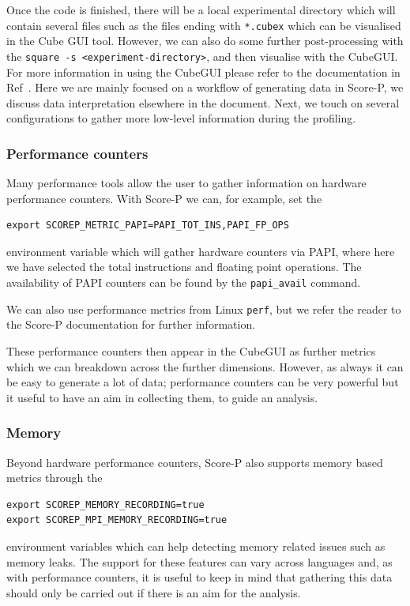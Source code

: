 Once the code is finished, there will be a local experimental directory which
will contain several files such as the files ending with \texttt{*.cubex} which
can be visualised in the Cube GUI tool. However, we can also do some further
post-processing with the \texttt{square -s <experiment-directory>}, and then
visualise with the CubeGUI. For more information in using the CubeGUI please
refer to the documentation in Ref~\cite{}. Here we are mainly focused on a
workflow of generating data in Score-P, we discuss data interpretation
elsewhere in the document. Next, we touch on several configurations to gather
more low-level information during the profiling.

\subsubsection{Performance counters}

Many performance tools allow the user to gather information on hardware
performance counters. With Score-P we can, for example, set the
\begin{verbatim}
export SCOREP_METRIC_PAPI=PAPI_TOT_INS,PAPI_FP_OPS
\end{verbatim}
environment variable which will gather hardware counters via PAPI, where here
we have selected the total instructions and floating point operations. The
availability of PAPI counters can be found by the \texttt{papi\_avail} command. 

We can also use performance metrics from Linux \texttt{perf}, but we refer the
reader to the Score-P documentation for further information.

These performance counters then appear in the CubeGUI as further metrics which
we can breakdown across the further dimensions. However, as always it can be
easy to generate a lot of data; performance counters can be very powerful but
it useful to have an aim in collecting them, to guide an analysis.

\subsubsection{Memory}

Beyond hardware performance counters, Score-P also supports memory based
metrics through the
\begin{verbatim}
export SCOREP_MEMORY_RECORDING=true
export SCOREP_MPI_MEMORY_RECORDING=true
\end{verbatim}
environment variables which can help detecting memory related issues such as
memory leaks. The support for these features can vary across languages and, as
with performance counters, it is useful to keep in mind that gathering this
data should only be carried out if there is an aim for the analysis.

